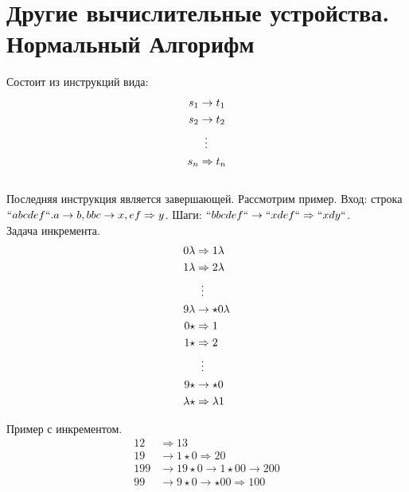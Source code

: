 \documentclass[a4paper]{article}
\begin{document}
\section{Другие вычислительные устройства. Нормальный Алгорифм}

{\large Состоит из инструкций вида:
\begin{align*}
  s_{1} &\rightarrow t_{1} \\
  s_{2} &\rightarrow t_{2} \\
        &\mathrel{\makebox[\widthof{=}]{\vdots}} \\
  s_{n} &\Rightarrow t_{n}
\end{align*}}
\\
{\large Последняя инструкция является завершающей. Рассмотрим пример. Вход: строка $``abcdef``. a \rightarrow b, bbc \rightarrow x, ef \Rightarrow y$. Шаги: $``bbcdef`` \rightarrow ``xdef`` \Rightarrow ``xdy``$.
\\
Задача инкремента. 
\begin{align*}
    0\lambda &\Rightarrow 1\lambda \\
    1\lambda &\Rightarrow 2\lambda \\
        &\mathrel{\makebox[\widthof{=}]{\vdots}} \\
    9\lambda &\rightarrow \star 0 \lambda\\
    0\star &\Rightarrow 1\\
    1\star &\Rightarrow 2\\
        &\mathrel{\makebox[\widthof{=}]{\vdots}} \\
    9\star &\rightarrow \star 0\\
    \lambda\star &\Rightarrow \lambda 1
\end{align*}}

{\large Пример с инкрементом. 
\begin{align*}
    12 &\Rightarrow 13 \\
    19 &\rightarrow 1\star 0 \Rightarrow 20 \\
    199 &\rightarrow 19\star 0 \rightarrow 1\star 00 \rightarrow 200\\
    99 &\rightarrow 9\star 0 \rightarrow \star 00 \Rightarrow 100
\end{align*}}
\end{document}
